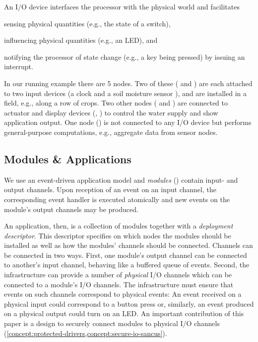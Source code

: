 An I/O device interfaces the processor with the physical world and
facilitates
\begin{paraenum}
  \item sensing physical quantities (e.g., the state of a switch),
  \item influencing physical quantities (e.g., an LED), and
  \item notifying the processor of state change (e.g., a key being pressed) by
  issuing an interrupt.
\end{paraenum}

In our running example there are 5 nodes. Two of these ( and )
are each attached to two input devices (a clock  and a soil moisture
sensor ), and are installed in a field, e.g., along a row of crops. Two
other nodes ( and ) are connected to actuator and display
devices (, ) to control the water supply and show application
output. One node () is not connected to any I/O device but
performs general-purpose computations, e.g., aggregate data from sensor nodes.



\subsection{Modules \& Applications}
%
We use an event-driven application model and \emph{modules} () contain
input- and output channels. Upon reception of an event on an input channel, the
corresponding event handler is executed atomically and new events on the
module's output channels may be produced.

An application, then, is a collection of modules together with a
\emph{deployment descriptor}. This descriptor specifies on which nodes the
modules should be installed as well as how the modules' channels should be
connected. Channels can be connected in two ways. First, one module's output
channel can be connected to another's input channel, behaving like a buffered
queue of events. Second, the infrastructure can provide a number of
\emph{physical} I/O channels which can be connected to a module's I/O channels.
\label{concept:physical-io-channel}
The infrastructure must ensure that events on such channels correspond to
physical events: An event received on a physical input could correspond to a
button press or, similarly, an event produced on a physical output could turn on
an LED. An important contribution of this paper is a design to securely connect
modules to physical I/O channels
(\cref{concept:protected-drivers,concept:secure-io-sancus}).

